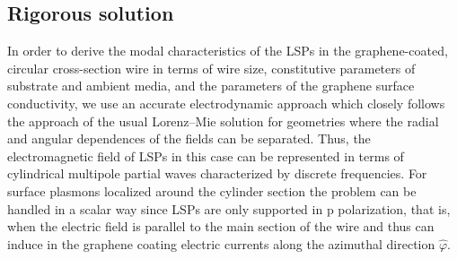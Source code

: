 \documentclass[9pt,twocolumn,twoside]{osajnl}
\begin{document}
\subsection{Rigorous solution}

In order to derive the modal characteristics of the LSPs in the graphene-coated, circular cross-section wire in terms of wire size, constitutive parameters of substrate and ambient media, and the parameters of the graphene surface conductivity, we use an accurate electrodynamic approach which closely follows the approach of the usual Lorenz–Mie solution for geometries where the radial and angular dependences of the fields can be separated. 
%
Thus, the electromagnetic field of LSPs in this case can be represented in terms of cylindrical multipole partial waves characterized by discrete frequencies. 
%
For surface plasmons localized around the cylinder section the problem can be handled in a scalar way since LSPs are only supported in p polarization, that is, when the electric field is parallel to the main section of the wire \cite{maximo1,CRD} and thus can induce in the graphene coating electric currents along the azimuthal direction $\hat \varphi$. 
\end{document}
